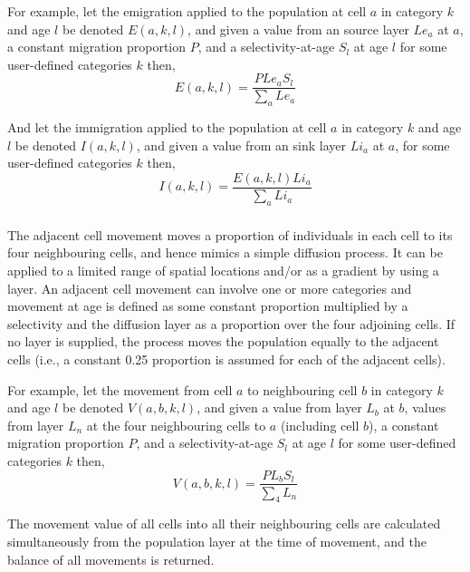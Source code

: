 For example, let the emigration applied to the population at cell $a$ in category $k$ and age $l$ be denoted $E(a,k,l)$, and given a value from an source layer $Le_a$  at $a$, a constant migration proportion $P$, and a selectivity-at-age $S_l$ at age $l$ for some user-defined categories $k$ then, 
\begin{equation}
  E(a,k,l) = \frac{P Le_a S_l }{\sum\limits_a Le_a}
\end{equation}

And let the immigration applied to the population at cell $a$ in category $k$ and age $l$ be denoted $I(a,k,l)$, and given a value from an sink layer $Li_a$  at $a$, for some user-defined categories $k$ then, 
\begin{equation}
  I(a,k,l) = \frac{E(a,k,l) Li_a }{\sum\limits_a Li_a} 
\end{equation}

\subsubsection{}

The adjacent cell movement moves a proportion of individuals in each cell to its four neighbouring cells, and hence mimics a simple diffusion process. It can be applied to a limited range of spatial locations and/or as a gradient by using a layer. An adjacent cell movement can involve one or more categories and movement at age is defined as some constant proportion multiplied by a selectivity and the diffusion layer as a proportion over the four adjoining cells. If no layer is supplied, the process moves the population equally to the adjacent cells (i.e., a constant 0.25 proportion is assumed for each of the adjacent cells).

For example, let the movement from cell $a$ to neighbouring cell $b$ in category $k$ and age $l$ be denoted $V(a,b,k,l)$, and given a value from layer $L_b$  at $b$, values from layer $L_n$ at the four neighbouring cells to $a$ (including cell $b$), a constant migration proportion $P$, and a selectivity-at-age $S_l$ at age $l$ for some user-defined categories $k$ then, 
\begin{equation}
  V(a,b,k,l) = \frac{P L_b S_l }{\sum\limits_4 L_n}
\end{equation}

The movement value of all cells into all their neighbouring cells are calculated simultaneously from the population layer at the time of movement, and the balance of all movements is returned.

